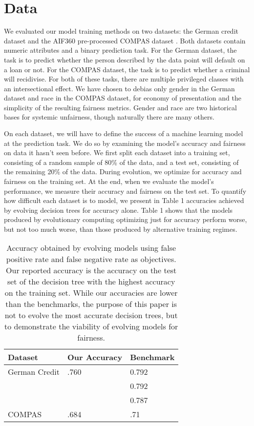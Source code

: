 \documentclass[twoside]{article}
\begin{document}
\section{Data}
We evaluated our model training methods on two datasets: the German credit dataset \citep{Dua:2019} and the AIF360 pre-processed COMPAS dataset \citep{Larson:2016}. Both datasets contain numeric attributes and a binary prediction task. For the German dataset, the task is to predict whether the person described by the data point will default on a loan or not. For the COMPAS dataset, the task is to predict whether a criminal will recidivise. For both of these tasks, there are multiple privileged classes with an intersectional effect. We have chosen to debias only gender in the German dataset and race in the COMPAS dataset, for economy of presentation and the simplicity of the resulting fairness metrics. Gender and race are two historical bases for systemic unfairness, though naturally there are many others.

On each dataset, we will have to define the success of a machine learning model at the prediction task. We do so by examining the model’s accuracy and fairness on data it hasn’t seen before. We first split each dataset into a training set, consisting of a random sample of 80\% of the data, and a test set, consisting of the remaining 20\% of the data. During evolution, we optimize for accuracy and fairness on the training set. At the end, when we evaluate the model’s performance, we measure their accuracy and fairness on the test set. To quantify how difficult each dataset is to model, we present in Table 1 accuracies achieved by evolving decision trees for accuracy alone. Table 1 shows that the models produced by evolutionary computing optimizing just for accuracy perform worse, but not too much worse, than those produced by alternative training regimes. 

\renewcommand{\arraystretch}{1.5}
\begin{table}
	\begin{center}
	\begin{tabular}{| l | l | l |}
	\hline Dataset & Our Accuracy & Benchmark 
	\\ \hline German Credit & .760 & 0.792 \citep{Abellan:2017}
	\\ & & 0.792 \citep{Bao:2019}
	\\ & & 0.787 \citep{Shen:2019} 
	\\ \hline COMPAS & .684 & .71 \citep{Larson:2016}
	\\ \hline
	\end{tabular}
	\end{center}
\caption{Accuracy obtained by evolving models using false positive rate and false negative rate as objectives. Our reported accuracy is the accuracy on the test set of the decision tree with the highest accuracy on the training set. While our accuracies are lower than the benchmarks, the purpose of this paper is not to evolve the most accurate decision trees, but to demonstrate the viability of evolving models for fairness.}
\label{table:name}
\end{table}
\end{document}
